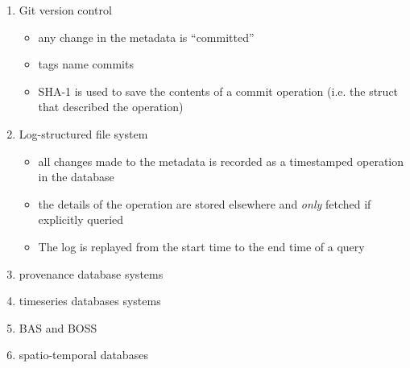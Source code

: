 \begin{enumerate}
\item Git version control
	\begin{itemize}
	\item any change in the metadata is ``committed''
	\item tags name commits
	\item SHA-1 is used to save the contents of a commit operation (i.e. the struct that described the operation)
	\end{itemize}
\item Log-structured file system
	\begin{itemize}
	\item all changes made to the metadata is recorded as a timestamped operation in the database
	\item the details of the operation are stored elsewhere and \emph{only} fetched if explicitly queried
	\item The log is replayed from the start time to the end time of a query 
	\end{itemize}
\item provenance database systems
\item timeseries databases systems
\item BAS and BOSS
\item spatio-temporal databases
\end{enumerate}


